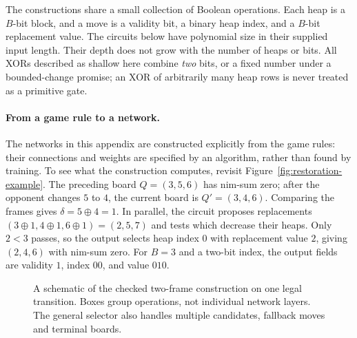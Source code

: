 \documentclass[11pt]{article}
\theoremstyle{plain}
\theoremstyle{definition}
\theoremstyle{remark}
\numberwithin{equation}{section}
\begin{document}
The constructions share a small collection of Boolean operations. Each heap is a $B$-bit block, and a move is a validity bit, a binary heap index, and a $B$-bit replacement value. The circuits below have polynomial size in their supplied input length. Their depth does not grow with the number of heaps or bits. All XORs described as shallow here combine \emph{two} bits, or a fixed number under a bounded-change promise; an XOR of arbitrarily many heap rows is never treated as a primitive gate.

\paragraph{From a game rule to a network.}
\label{par:construction-example}
The networks in this appendix are constructed explicitly from the game rules: their connections and weights are specified by an algorithm, rather than found by training. To see what the construction computes, revisit Figure~\ref{fig:restoration-example}. The preceding board $Q=(3,5,6)$ has nim-sum zero; after the opponent changes $5$ to $4$, the current board is $Q'=(3,4,6)$. Comparing the frames gives $\delta=5\oplus4=1$. In parallel, the circuit proposes replacements $(3\oplus1,4\oplus1,6\oplus1)=(2,5,7)$ and tests which decrease their heaps. Only $2<3$ passes, so the output selects heap index $0$ with replacement value $2$, giving $(2,4,6)$ with nim-sum zero. For $B=3$ and a two-bit index, the output fields are validity $1$, index $00$, and value $010$.

\begin{figure}[htbp]
\centering
{}
\caption{A schematic of the checked two-frame construction on one legal transition. Boxes group operations, not individual network layers. The general selector also handles multiple candidates, fallback moves and terminal boards.}
\label{fig:construction-pipeline}
\end{figure}
\end{document}
